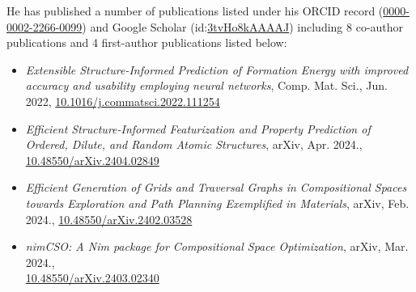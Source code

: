 \documentclass[letterpaper, 12pt]{report}
\begin{document}
He has published a number of publications listed under his ORCID record (\href{https://orcid.org/0000-0002-2266-0099}{0000-0002-2266-0099}) and Google Scholar (id:\href{https://scholar.google.com/citations?user=3tvHo8kAAAAJ}{3tvHo8kAAAAJ}) including 8 co-author publications and 4 first-author publications listed below:
\begin{itemize}


    \item \textit{Extensible Structure-Informed Prediction of Formation Energy with improved accuracy and usability employing neural networks}, Comp. Mat. Sci., Jun. 2022, \href{https://doi.org/10.1016/j.commatsci.2022.111254}{10.1016/j.commatsci.2022.111254}


    \item \textit{Efficient Structure-Informed Featurization and Property Prediction of Ordered, Dilute, and Random Atomic Structures}, arXiv, Apr. 2024., \href{https://doi.org/10.48550/arXiv.2404.02849}{10.48550/arXiv.2404.02849} 


    \item \textit{Efficient Generation of Grids and Traversal Graphs in Compositional Spaces towards Exploration and Path Planning Exemplified in Materials}, arXiv, Feb. 2024., \href{https://doi.org/10.48550/arXiv.2402.03528}{10.48550/arXiv.2402.03528}

    \item \textit{nimCSO: A Nim
package for Compositional Space Optimization}, arXiv, Mar. 2024.,\\ \href{https://doi.org/10.48550/arXiv.2403.02340}{10.48550/arXiv.2403.02340}
    
\end{itemize}
\end{document}
